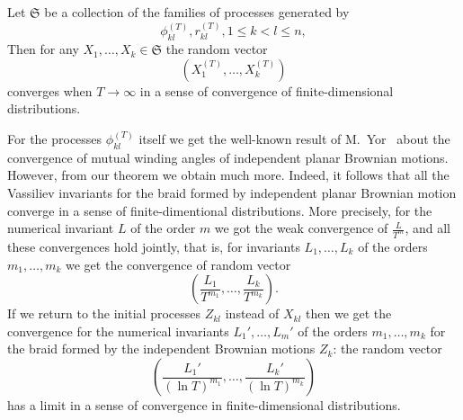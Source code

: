 \documentclass[12pt, a4paper, titlepage]{article}
\begin{document}
\begin{theorem}
 Let $\mathfrak{S}$ be a collection of the families of processes
generated by 
$$\phi_{kl}^{(T)}, r_{kl}^{(T)}, 1 \le k < l \le n,$$
Then for any $X_1, \ldots, X_k \in \mathfrak{S}$ the random vector
$$(X_1^{(T)}, \ldots, X_k^{(T)})$$
converges when $T \to \infty$ in a sense of convergence of finite-dimensional distributions. 
\end{theorem}

For the processes $\phi_{kl}^{(T)}$ itself we get the well-known result of M.~Yor~\cite{Yor1991}
about the convergence of mutual winding angles of independent planar Brownian motions.
However, from our theorem we obtain much more. Indeed, it follows that all the Vassiliev
invariants for the braid formed by independent planar Brownian motion converge in a sense of 
finite-dimentional distributions. More precisely, for the numerical invariant $L$ of the order $m$
we got the weak convergence of $\frac{L}{T^m}$, and all these convergences hold jointly, that is,
for invariants $L_1, \ldots, L_k$ of the orders $m_1, \ldots, m_k$
we get the convergence of random vector
$$\left(\frac{L_1}{T^{m_1}}, \ldots, \frac{L_k}{T^{m_k}}\right).$$
If we return to the initial processes $Z_{kl}$ instead of $X_{kl}$
then we get the convergence for the numerical invariants $L_1', \ldots, L_m'$
of the orders $m_1, \ldots, m_k$
for the braid formed by the independent Brownian motions $Z_k$: the random vector
$$\left(\frac{L_1'}{(\ln{T})^{m_1}}, \ldots, \frac{L_k'}{(\ln{T})^{m_k}}\right)$$
has a limit in a sense of convergence in finite-dimensional distributions. 
\end{document}
